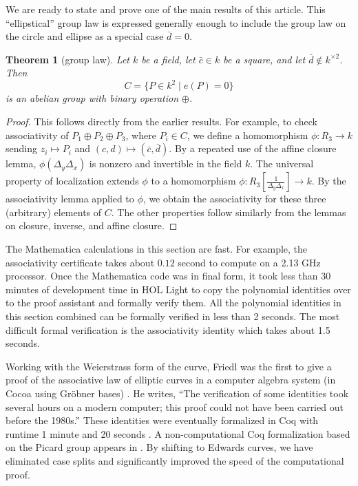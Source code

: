 \documentclass[12pt]{article}
\newtheorem{theorem}{Theorem}[subsection]
\newcommand{\f}[1]{\frac{1}{#1}}
\begin{document}
We are ready to state and prove one of the main results of this
article.  This ``ellipstical'' group law is expressed generally enough
to include the group law on the circle and ellipse as a special case 
$\bar d = 0$.

\begin{theorem}[group law]\label{thm:group} 
  Let $k$ be a field, let $\bar c \in k$ be a square, and let $\bar
  d\not\in k^{\times 2}$.  
  Then 
  \[
  C= \{P\in k^2 \mid  e(P) = 0\}
  \]
   is an abelian
  group with binary operation $\oplus$.
\end{theorem}

\begin{proof} This follows directly from the earlier results.  For
  example, to check associativity of $P_1\oplus P_2\oplus P_3$,
  where $P_i\in C$, we define a homomorphism
  $\phi:R_3\to k$ sending $z_i\mapsto P_i$ and
  $(c,d)\mapsto (\bar c,\bar d)$.  By a repeated use of the affine
  closure lemma, $\phi(\Delta_y\Delta_x)$ is nonzero and invertible in
  the field $k$.  The universal property of localization extends
  $\phi$ to a homomorphism $\phi:R_3[\f{\Delta_y\Delta_x}]\to k$.  By
  the associativity lemma applied to $\phi$, we obtain the
  associativity for these three (arbitrary) elements of $C$.  The
  other properties follow similarly from the lemmas on closure,
  inverse, and affine closure.
\end{proof}

The Mathematica calculations in this section are fast. For example,
the associativity certificate takes about $0.12$ second to compute on
a 2.13 GHz processor.  Once the Mathematica code was in final form, it
took less than 30 minutes of development time in HOL Light to copy the
polynomial identities over to the proof assistant and formally verify
them.  All the polynomial identities in this section combined can be
formally verified in less than 2 seconds. The most difficult formal
verification is the associativity identity which takes about 1.5
seconds.

Working with the Weierstrass form of the curve, Friedl was the first
to give a proof of the associative law of elliptic curves in a
computer algebra system (in Cocoa using Gr\"obner bases)
\cite{friedl}.  He writes, ``The verification of some identities took
several hours on a modern computer; this proof could not have been
carried out before the 1980s.''  These identities were eventually
formalized in Coq with runtime 1 minute and 20 seconds
\cite{thery2007proving}.  A non-computational Coq
formalization based on the Picard group appears in
\cite{bartzia2014formal}.  By shifting to Edwards curves, we have
eliminated case splits and
significantly improved the speed of the computational proof.
\end{document}
